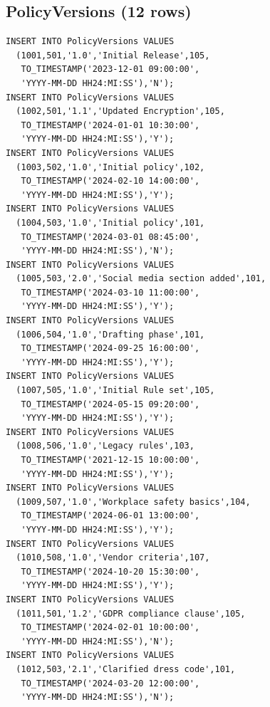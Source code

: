 \documentclass[conference]{IEEEtran}
\begin{document}
\subsection{PolicyVersions (12 rows)}
\begin{lstlisting}[style=sqlstyle, caption={DML: INSERT INTO PolicyVersions}]
INSERT INTO PolicyVersions VALUES
  (1001,501,'1.0','Initial Release',105,
   TO_TIMESTAMP('2023-12-01 09:00:00',
   'YYYY-MM-DD HH24:MI:SS'),'N');
INSERT INTO PolicyVersions VALUES
  (1002,501,'1.1','Updated Encryption',105,
   TO_TIMESTAMP('2024-01-01 10:30:00',
   'YYYY-MM-DD HH24:MI:SS'),'Y');
INSERT INTO PolicyVersions VALUES
  (1003,502,'1.0','Initial policy',102,
   TO_TIMESTAMP('2024-02-10 14:00:00',
   'YYYY-MM-DD HH24:MI:SS'),'Y');
INSERT INTO PolicyVersions VALUES
  (1004,503,'1.0','Initial policy',101,
   TO_TIMESTAMP('2024-03-01 08:45:00',
   'YYYY-MM-DD HH24:MI:SS'),'N');
INSERT INTO PolicyVersions VALUES
  (1005,503,'2.0','Social media section added',101,
   TO_TIMESTAMP('2024-03-10 11:00:00',
   'YYYY-MM-DD HH24:MI:SS'),'Y');
INSERT INTO PolicyVersions VALUES
  (1006,504,'1.0','Drafting phase',101,
   TO_TIMESTAMP('2024-09-25 16:00:00',
   'YYYY-MM-DD HH24:MI:SS'),'Y');
INSERT INTO PolicyVersions VALUES
  (1007,505,'1.0','Initial Rule set',105,
   TO_TIMESTAMP('2024-05-15 09:20:00',
   'YYYY-MM-DD HH24:MI:SS'),'Y');
INSERT INTO PolicyVersions VALUES
  (1008,506,'1.0','Legacy rules',103,
   TO_TIMESTAMP('2021-12-15 10:00:00',
   'YYYY-MM-DD HH24:MI:SS'),'Y');
INSERT INTO PolicyVersions VALUES
  (1009,507,'1.0','Workplace safety basics',104,
   TO_TIMESTAMP('2024-06-01 13:00:00',
   'YYYY-MM-DD HH24:MI:SS'),'Y');
INSERT INTO PolicyVersions VALUES
  (1010,508,'1.0','Vendor criteria',107,
   TO_TIMESTAMP('2024-10-20 15:30:00',
   'YYYY-MM-DD HH24:MI:SS'),'Y');
INSERT INTO PolicyVersions VALUES
  (1011,501,'1.2','GDPR compliance clause',105,
   TO_TIMESTAMP('2024-02-01 10:00:00',
   'YYYY-MM-DD HH24:MI:SS'),'N');
INSERT INTO PolicyVersions VALUES
  (1012,503,'2.1','Clarified dress code',101,
   TO_TIMESTAMP('2024-03-20 12:00:00',
   'YYYY-MM-DD HH24:MI:SS'),'N');
\end{lstlisting}
\end{document}
